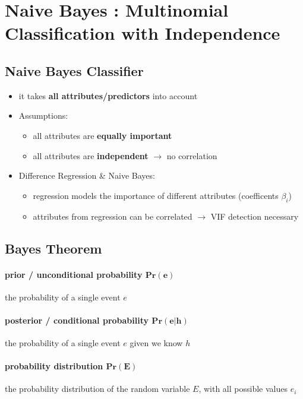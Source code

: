\section{Naive Bayes : Multinomial Classification with Independence}
\subsection{Naive Bayes Classifier}
\begin{itemize}
	\item it takes \textbf{all attributes/predictors} into account
	\item Assumptions:
	\begin{itemize}
		\item all attributes are \textbf{equally important}
		\item all attributes are \textbf{independent} $\rightarrow$ no correlation
	\end{itemize}
	\item Difference Regression \& Naive Bayes:
	\begin{itemize}
		\item regression models the importance of different attributes (coefficents $\beta_i$)
		\item attributes from regression can be correlated $\rightarrow$ VIF detection necessary
	\end{itemize}
\end{itemize}

\subsection{Bayes Theorem}
\paragraph{prior / unconditional probability $\mathbf{Pr(e)}$} the probability of a single event $e$
\paragraph{posterior / conditional probability $\mathbf{Pr(e|h)}$} the probability of a single event $e$ given we know $h$
\paragraph{probability distribution $\mathbf{Pr(E)}$} the probability distribution of the random variable $E$, with all possible values $e_i$

